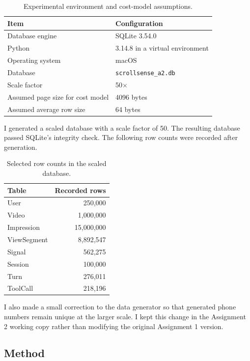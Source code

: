 \documentclass[11pt,a4paper]{article}
\begin{document}
\begin{table}[H]
\centering
\begin{tabular}{ll}
\toprule
\textbf{Item} & \textbf{Configuration} \\
\midrule
Database engine & SQLite 3.54.0 \\
Python & 3.14.8 in a virtual environment \\
Operating system & macOS \\
Database & \texttt{scrollsense\_a2.db} \\
Scale factor & 50$\times$ \\
Assumed page size for cost model & 4096 bytes \\
Assumed average row size & 64 bytes \\
\bottomrule
\end{tabular}
\caption{Experimental environment and cost-model assumptions.}
\end{table}

I generated a scaled database with a scale factor of 50. The resulting
database passed SQLite's integrity check. The following row counts
were recorded after generation.

\begin{table}[H]
\centering
\begin{tabular}{lr}
\toprule
\textbf{Table} & \textbf{Recorded rows} \\
\midrule
User & 250,000 \\
Video & 1,000,000 \\
Impression & 15,000,000 \\
ViewSegment & 8,892,547 \\
Signal & 562,275 \\
Session & 100,000 \\
Turn & 276,011 \\
ToolCall & 218,196 \\
\bottomrule
\end{tabular}
\caption{Selected row counts in the scaled database.}
\end{table}

I also made a small correction to the data generator so that generated
phone numbers remain unique at the larger scale. I kept this change
in the Assignment 2 working copy rather than modifying the original
Assignment 1 version.

\subsection{Method}
\end{document}
